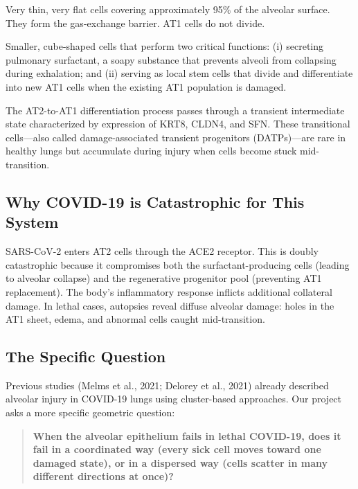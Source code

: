 \documentclass[11pt]{article}
\begin{document}
\begin{description}[style=nextline]
\item[AT1 cells (Alveolar Type 1)] Very thin, very flat cells covering approximately 95\% of the alveolar surface. They form the gas-exchange barrier. AT1 cells do not divide.
\item[AT2 cells (Alveolar Type 2)] Smaller, cube-shaped cells that perform two critical functions: (i) secreting pulmonary surfactant, a soapy substance that prevents alveoli from collapsing during exhalation; and (ii) serving as local stem cells that divide and differentiate into new AT1 cells when the existing AT1 population is damaged.
\end{description}

The AT2-to-AT1 differentiation process passes through a transient intermediate state characterized by expression of KRT8, CLDN4, and SFN. These transitional cells---also called damage-associated transient progenitors (DATPs)---are rare in healthy lungs but accumulate during injury when cells become stuck mid-transition.

\subsection{Why COVID-19 is Catastrophic for This System}

SARS-CoV-2 enters AT2 cells through the ACE2 receptor. This is doubly catastrophic because it compromises both the surfactant-producing cells (leading to alveolar collapse) and the regenerative progenitor pool (preventing AT1 replacement). The body's inflammatory response inflicts additional collateral damage. In lethal cases, autopsies reveal diffuse alveolar damage: holes in the AT1 sheet, edema, and abnormal cells caught mid-transition.

\subsection{The Specific Question}

Previous studies (Melms et al., 2021; Delorey et al., 2021) already described alveolar injury in COVID-19 lungs using cluster-based approaches. Our project asks a more specific geometric question:

\begin{quote}
\textbf{When the alveolar epithelium fails in lethal COVID-19, does it fail in a coordinated way (every sick cell moves toward one damaged state), or in a dispersed way (cells scatter in many different directions at once)?}
\end{quote}
\end{document}
